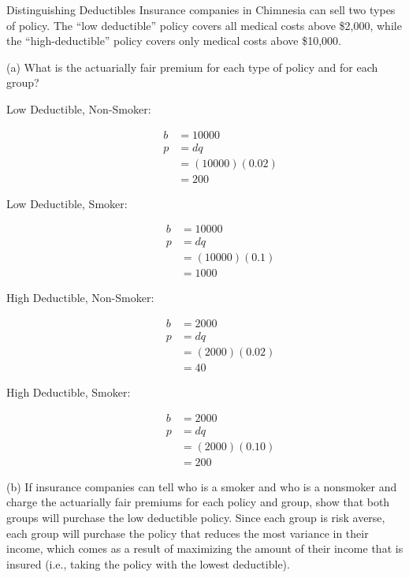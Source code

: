\documentclass[8pt]{extarticle}
\begin{document}
\begin{problem}{Distinguishing Deductibles}
    Insurance companies in Chimnesia can sell two types of policy. The ``low deductible'' policy covers all medical costs above \$2,000, while the ``high-deductible'' policy covers only medical costs above \$10,000.
    \begin{problem}{(a)}
      What is the actuarially fair premium for each type of policy and for each group?
      \tcblower
      \begin{description}
        \item[Low Deductible, Non-Smoker:]
          \begin{align*}
            b &= 10000\\
            p&= dq\\
             &= (10000)(0.02)\\
             &= 200
          \end{align*}
        \item[Low Deductible, Smoker:]
          \begin{align*}
            b &= 10000\\
            p&= dq\\
             &= (10000)(0.1)\\
             &= 1000
          \end{align*}
        \item[High Deductible, Non-Smoker:]
          \begin{align*}
            b &= 2000\\
            p&= dq\\
             &= (2000)(0.02)\\
             &= 40
          \end{align*}
        \item[High Deductible, Smoker:]
          \begin{align*}
            b &= 2000\\
            p&= dq\\
             &= (2000)(0.10)\\
             &= 200
          \end{align*}
      \end{description}
    \end{problem}
    \begin{problem}{(b)}
      If insurance companies can tell who is a smoker and who is a nonsmoker and charge the actuarially fair premiums for each policy and group, show that both groups will purchase the low deductible policy.
      \tcblower
      Since each group is risk averse, each group will purchase the policy that reduces the most variance in their income, which comes as a result of maximizing the amount of their income that is insured (i.e., taking the policy with the lowest deductible).

\end{problem}
\end{problem}
\end{document}
